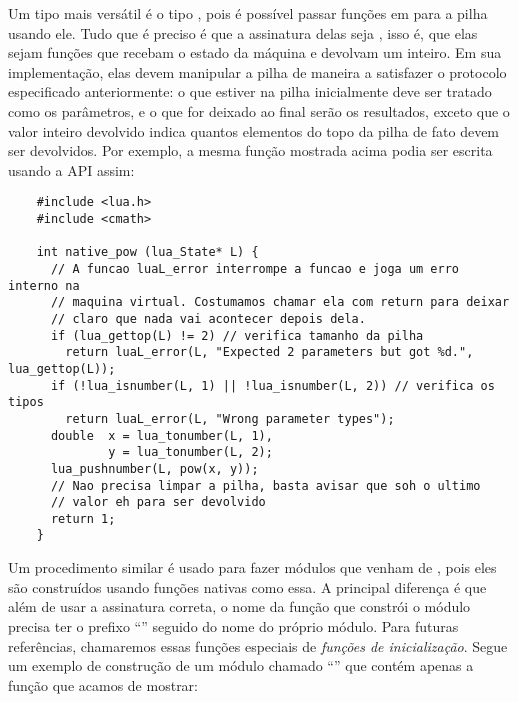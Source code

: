       Um tipo mais versátil é o tipo , pois é possível passar
      funções em \C{} para a pilha usando ele. Tudo que é preciso é que a
      assinatura delas seja , isso é, que
      elas sejam funções que recebam o estado da máquina e devolvam um inteiro.
      Em sua implementação, elas devem manipular a pilha de maneira a satisfazer o
      protocolo especificado anteriormente: o que estiver na pilha inicialmente
      deve ser tratado como os parâmetros, e o que for deixado ao final serão
      os resultados, exceto que o valor inteiro devolvido indica quantos
      elementos do topo da pilha de fato devem ser devolvidos. Por exemplo, a
      mesma função  mostrada acima podia ser escrita usando a API
      assim:

      \vspace{1em}

    \begin{lstlisting}
    #include <lua.h>
    #include <cmath>

    int native_pow (lua_State* L) {
      // A funcao luaL_error interrompe a funcao e joga um erro interno na
      // maquina virtual. Costumamos chamar ela com return para deixar
      // claro que nada vai acontecer depois dela.
      if (lua_gettop(L) != 2) // verifica tamanho da pilha
        return luaL_error(L, "Expected 2 parameters but got %d.", lua_gettop(L));
      if (!lua_isnumber(L, 1) || !lua_isnumber(L, 2)) // verifica os tipos
        return luaL_error(L, "Wrong parameter types");
      double  x = lua_tonumber(L, 1),
              y = lua_tonumber(L, 2);
      lua_pushnumber(L, pow(x, y));
      // Nao precisa limpar a pilha, basta avisar que soh o ultimo
      // valor eh para ser devolvido
      return 1;
    }
    \end{lstlisting}

      \vspace{1em}

      Um procedimento similar é usado para fazer módulos  que venham
      de \C{}, pois eles são
      construídos usando funções nativas como essa. A principal diferença é que
      além de usar a assinatura correta, o nome da função que constrói o módulo
      precisa ter o prefixo ``'' seguido do nome do próprio módulo.
      Para futuras referências, chamaremos essas funções especiais de
      \emph{funções de inicialização}. Segue um exemplo de construção de um
      módulo chamado ``'' que contém apenas a função 
      que acamos de mostrar:

